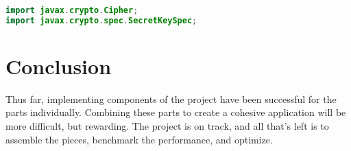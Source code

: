 \documentclass[10pt,a4paper]{article}
\begin{document}
\begin{lstlisting}[language=Java]
import javax.crypto.Cipher;
import javax.crypto.spec.SecretKeySpec;
\end{lstlisting}

\section{Conclusion}
Thus far, implementing components of the project have been successful for the parts individually. Combining these parts to create a cohesive application will be more difficult, but rewarding. The project is on track, and all that's left is to assemble the pieces, benchmark the performance, and optimize.
\end{document}
